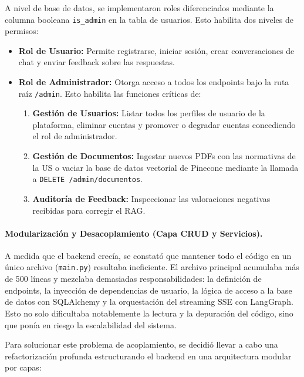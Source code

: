 \documentclass[12pt,a4paper,oneside]{report}
\begin{document}
A nivel de base de datos, se implementaron roles diferenciados mediante la columna booleana \texttt{is\_admin} en la tabla de usuarios. Esto habilita dos niveles de permisos:
\begin{itemize}
    \item \textbf{Rol de Usuario:} Permite registrarse, iniciar sesión, crear conversaciones de chat y enviar feedback sobre las respuestas.
    \item \textbf{Rol de Administrador:} Otorga acceso a todos los endpoints bajo la ruta raíz \texttt{/admin}. Esto habilita las funciones críticas de:
    \begin{enumerate}
        \item \textbf{Gestión de Usuarios:} Listar todos los perfiles de usuario de la plataforma, eliminar cuentas y promover o degradar cuentas concediendo el rol de administrador.
        \item \textbf{Gestión de Documentos:} Ingestar nuevos PDFs con las normativas de la US o vaciar la base de datos vectorial de Pinecone mediante la llamada a \texttt{DELETE /admin/documentos}.
        \item \textbf{Auditoría de Feedback:} Inspeccionar las valoraciones negativas recibidas para corregir el RAG.
    \end{enumerate}
\end{itemize}

\paragraph{Modularización y Desacoplamiento (Capa CRUD y Servicios).} A medida que el backend crecía, se constató que mantener todo el código en un único archivo (\texttt{main.py}) resultaba ineficiente. El archivo principal acumulaba más de 500 líneas y mezclaba demasiadas responsabilidades: la definición de endpoints, la inyección de dependencias de usuario, la lógica de acceso a la base de datos con SQLAlchemy y la orquestación del streaming SSE con LangGraph. Esto no solo dificultaba notablemente la lectura y la depuración del código, sino que ponía en riesgo la escalabilidad del sistema.

Para solucionar este problema de acoplamiento, se decidió llevar a cabo una refactorización profunda estructurando el backend en una arquitectura modular por capas:
\end{document}
